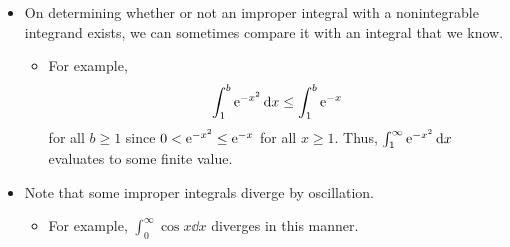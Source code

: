 \documentclass[../main.tex]{subfiles}
\begin{document}
\begin{itemize}
\begin{equation*}
    \end{equation*}
    \item On determining whether or not an improper integral with a nonintegrable integrand exists, we can sometimes compare it with an integral that we know.
    \begin{itemize}
        \item For example,
        \begin{equation*}
            \int_1^b\e[-x^2]\dd{x} \leq \int_1^b\e[-x]
        \end{equation*}
        for all $b\geq 1$ since $0<\e[-x^2]\leq\e[-x]$ for all $x\geq 1$. Thus, $\int_1^\infty \e[-x^2]\dd{x}$ evaluates to some finite value.
    \end{itemize}
    \item Note that some improper integrals diverge by oscillation.
    \begin{itemize}
        \item For example, $\int_0^\infty \cos x\dd{x}$ diverges in this manner.
    \end{itemize}
\end{itemize}
\end{document}
